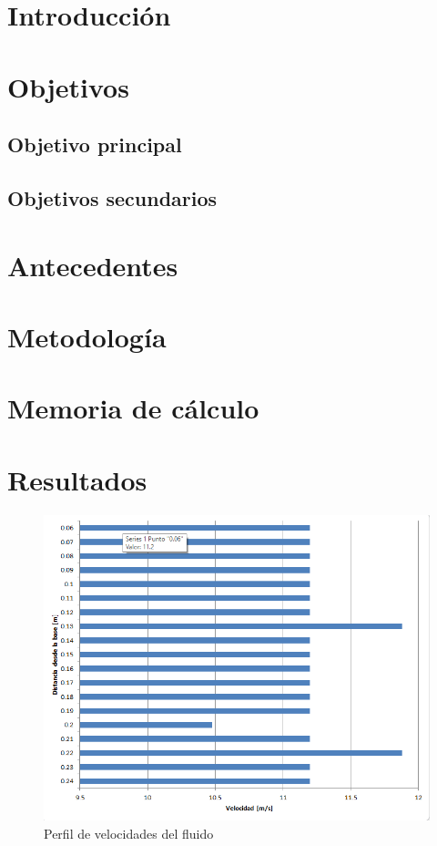\documentclass[11pt,letterpaper]{extarticle}        %
\numberwithin{equation}{section}                    %
\begin{document}
\pagestyle{fancy}
\thispagestyle{NoPortadaNoEnumerada}

\newpage
\tableofcontents        %
\newpage
\listoffigures          %
\listoftables           %


\newpage
\setcounter{page}{1}
\pagestyle{NoPortada}

\section{Introducción}


\section{Objetivos}
\subsection*{Objetivo principal}
\subsection*{Objetivos secundarios}
\section{Antecedentes}
\section{Metodología}
\section{Memoria de cálculo}
\section{Resultados}

\begin{figure}[H]
\centering
\includegraphics[width = 0.5\linewidth]{Perfil}
\caption{Perfil de velocidades del fluido}
\end{figure}
\end{document}
